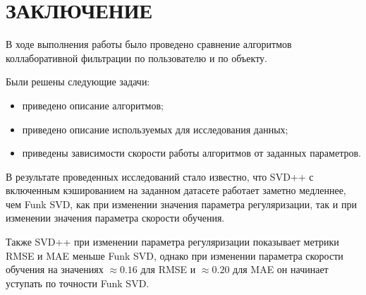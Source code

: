 \section*{ЗАКЛЮЧЕНИЕ}
В ходе выполнения работы было проведено сравнение алгоритмов коллаборативной фильтрации по пользователю и по объекту.

Были решены следующие задачи:
\begin{itemize}
	\item приведено описание алгоритмов;
	\item приведено описание используемых для исследования данных;
	\item приведены зависимости скорости работы алгоритмов от заданных параметров.
\end{itemize}

В результате проведенных исследований стало известно, что SVD++ с включенным кэшированием на заданном датасете работает заметно медленнее, чем Funk SVD, как при изменении значения параметра регуляризации, так и при изменении значения параметра скорости обучения.

Также SVD++ при изменении параметра регуляризации показывает метрики RMSE и MAE меньше Funk SVD, однако при изменении параметра скорости обучения на значениях $\approx 0.16$ для RMSE и $\approx 0.20$ для MAE он начинает уступать по точности Funk SVD.

\pagebreak